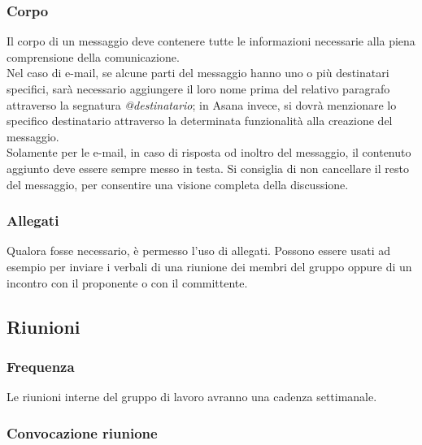 \documentclass[../NormeDiProgetto.tex]{subfiles}
\begin{document}
			\subsubsection{Corpo}
				Il corpo di un messaggio deve contenere tutte le informazioni
				necessarie alla piena comprensione della comunicazione.\\
				Nel caso di e-mail, se alcune parti del messaggio hanno uno o più destinatari specifici,
				sarà necessario aggiungere il loro nome	prima del relativo paragrafo
				attraverso la segnatura	\textit{@destinatario};
				in Asana invece, si dovrà menzionare lo specifico destinatario
				attraverso la determinata funzionalità alla creazione del messaggio.\\
				Solamente per le e-mail, in caso di risposta od inoltro del
				messaggio, il contenuto aggiunto deve essere sempre messo in testa.
				Si consiglia di non cancellare il resto del messaggio,
				per consentire una visione completa della discussione.
			\subsubsection{Allegati}
				Qualora fosse necessario, è permesso l'uso di allegati. Possono
				essere usati ad esempio per inviare i verbali di una riunione dei
				membri del gruppo oppure di un incontro con il proponente o con
				il committente.
				
				
				\subsection{Riunioni}
				\subsubsection{Frequenza}
				Le riunioni interne del gruppo di lavoro avranno una cadenza settimanale.
				\subsubsection{Convocazione riunione}
\end{document}
